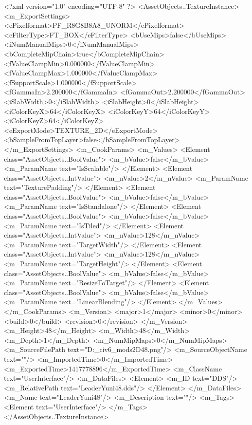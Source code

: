 <?xml version="1.0" encoding="UTF-8" ?>
<AssetObjects..TextureInstance>
	<m_ExportSettings>
		<ePixelformat>PF_R8G8B8A8_UNORM</ePixelformat>
		<eFilterType>FT_BOX</eFilterType>
		<bUseMips>false</bUseMips>
		<iNumManualMips>0</iNumManualMips>
		<bCompleteMipChain>true</bCompleteMipChain>
		<fValueClampMin>0.000000</fValueClampMin>
		<fValueClampMax>1.000000</fValueClampMax>
		<fSupportScale>1.000000</fSupportScale>
		<fGammaIn>2.200000</fGammaIn>
		<fGammaOut>2.200000</fGammaOut>
		<iSlabWidth>0</iSlabWidth>
		<iSlabHeight>0</iSlabHeight>
		<iColorKeyX>64</iColorKeyX>
		<iColorKeyY>64</iColorKeyY>
		<iColorKeyZ>64</iColorKeyZ>
		<eExportMode>TEXTURE_2D</eExportMode>
		<bSampleFromTopLayer>false</bSampleFromTopLayer>
	</m_ExportSettings>
	<m_CookParams>
		<m_Values>
			<Element class="AssetObjects..BoolValue">
				<m_bValue>false</m_bValue>
				<m_ParamName text="IsScalable"/>
			</Element>
			<Element class="AssetObjects..IntValue">
				<m_nValue>2</m_nValue>
				<m_ParamName text="TexturePadding"/>
			</Element>
			<Element class="AssetObjects..BoolValue">
				<m_bValue>false</m_bValue>
				<m_ParamName text="IsStandalone"/>
			</Element>
			<Element class="AssetObjects..BoolValue">
				<m_bValue>false</m_bValue>
				<m_ParamName text="IsTiled"/>
			</Element>
			<Element class="AssetObjects..IntValue">
				<m_nValue>128</m_nValue>
				<m_ParamName text="TargetWidth"/>
			</Element>
			<Element class="AssetObjects..IntValue">
				<m_nValue>128</m_nValue>
				<m_ParamName text="TargetHeight"/>
			</Element>
			<Element class="AssetObjects..BoolValue">
				<m_bValue>false</m_bValue>
				<m_ParamName text="ResizeToTarget"/>
			</Element>
			<Element class="AssetObjects..BoolValue">
				<m_bValue>false</m_bValue>
				<m_ParamName text="LinearBlending"/>
			</Element>
		</m_Values>
	</m_CookParams>
	<m_Version>
		<major>1</major>
		<minor>0</minor>
		<build>0</build>
		<revision>0</revision>
	</m_Version>
	<m_Height>48</m_Height>
	<m_Width>48</m_Width>
	<m_Depth>1</m_Depth>
	<m_NumMipMaps>0</m_NumMipMaps>
	<m_SourceFilePath text="D:\Documents\GitHub\Uzuki_civ6_mods\LandsolYuni\Texture2D\LeaderYuni48.png"/>
	<m_SourceObjectName text=""/>
	<m_ImportedTime>0</m_ImportedTime>
	<m_ExportedTime>1417778896</m_ExportedTime>
	<m_ClassName text="UserInterface"/>
	<m_DataFiles>
		<Element>
			<m_ID text="DDS"/>
			<m_RelativePath text="LeaderYuni48.dds"/>
		</Element>
	</m_DataFiles>
	<m_Name text="LeaderYuni48"/>
	<m_Description text=""/>
	<m_Tags>
		<Element text="UserInterface"/>
	</m_Tags>
</AssetObjects..TextureInstance>

